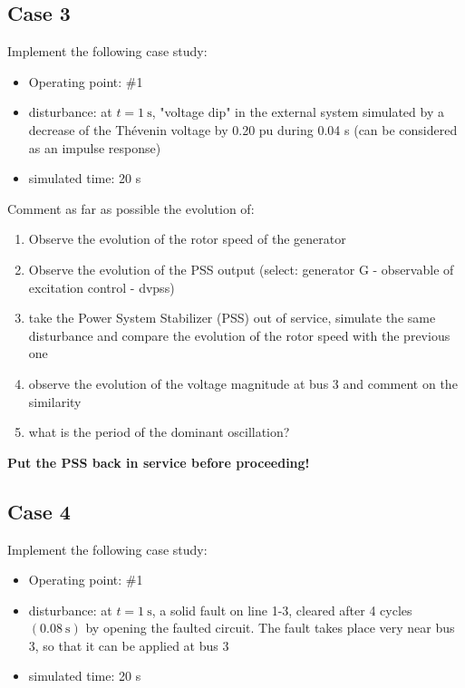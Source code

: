 \documentclass[a4paper,11pt,oneside,onecolumn]{article}
\begin{document}
\subsection{Case 3}

Implement the following case study:
\begin{itemize}
\item Operating point: \#1
\item disturbance: at $t=1 \mathrm{~s}$, "voltage dip" in the external system simulated by a decrease of the Thévenin voltage by 0.20 pu during 0.04 s (can be considered as an impulse response)
\item simulated time: 20 s
\end{itemize}

\noindent Comment as far as possible the evolution of:
\begin{enumerate}
\item Observe the evolution of the rotor speed of the generator
\item Observe the evolution of the PSS output (select: generator G - observable of excitation control - dvpss)
\item take the Power System Stabilizer (PSS) out of service, simulate the same disturbance and compare the evolution of the rotor speed with the previous one
\item observe the evolution of the voltage magnitude at bus 3 and comment on the similarity
\item what is the period of the dominant oscillation?
	
\end{enumerate}

\noindent \textbf{Put the PSS back in service before proceeding!}

\subsection{Case 4}

Implement the following case study:
\begin{itemize}
\item Operating point: \#1
\item disturbance: at $t=1 \mathrm{~s}$, a solid fault on line 1-3, cleared after 4 cycles $(0.08 \mathrm{~s})$ by opening the faulted circuit. The fault takes place very near bus 3, so that it can be applied at bus 3
\item simulated time: 20 s
\end{itemize}
\end{document}
